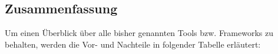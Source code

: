 
\subsection{Zusammenfassung}
Um einen Überblick über alle bisher genannten Tools bzw. Frameworks zu behalten, werden die Vor- und Nachteile in folgender Tabelle erläutert: \\
